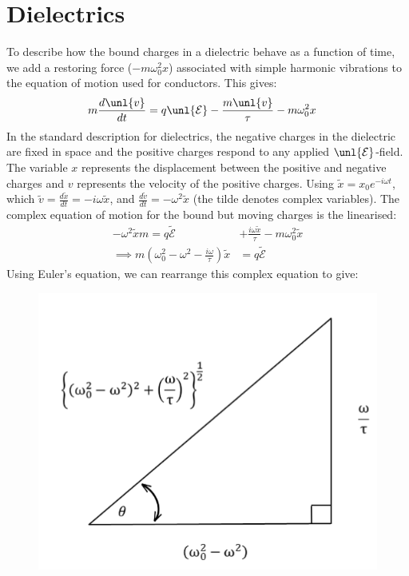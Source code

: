 \documentclass[a4paper, 11pt, normalem]{report}
\newcommand\E{\mathcal{E}}
\newcommand\uE{\unl{\E}}
\newcommand\om{\omega}
\newcommand\tx{\tilde{x}}
\newcommand\tv{\tilde{v}}
\begin{document}
\section{Dielectrics}
To describe how the bound charges in a dielectric behave as a function of time, we add a restoring force ($-m\om_0^2x$) associated with simple harmonic vibrations to the equation of motion  used for conductors.
This gives:
\begin{align*}
	m\frac{d\unl{v}}{dt} &= q\uE - \frac{m\unl{v}}{\tau} - m\om_0^2x
\end{align*}
In the standard description for dielectrics, the negative charges in the dielectric are fixed in space and the positive charges respond to any applied $\uE$-field.
The variable $x$ represents the displacement between the positive and negative charges and $v$ represents the velocity of the positive charges.
Using $\tx = x_0e^{-i\om t}$, which $\tv = \frac{d\tx}{dt} = -i\om \tx$, and $\frac{d\tv}{dt} = -\om^2\tx$ (the tilde denotes complex variables).
The complex equation of motion for the bound but moving charges is the linearised:
\begin{align*}
	-\om^2\tx m = q\tilde{\E} &+ \frac{i\om\tx}{\tau} - m\om_0^2\tx \\
	\implies m\left(\om_0^2 - \om^2 - \frac{i\om}{\tau}\right)\tx &= q\tilde{\E}
\end{align*}
Using Euler's equation, we can rearrange this complex equation to give:
\begin{figure}[H]
	\centering
	\includegraphics[scale=0.4]{pyth.png}
\end{figure}
\end{document}
